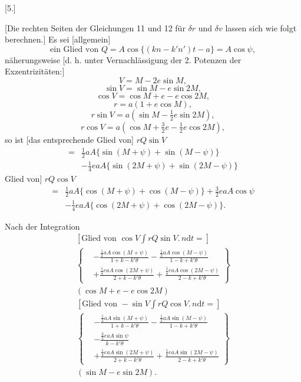 \par\bigskip
\hypertarget{native-392-ceres5}{}
\begin{center}[5.]\end{center}
\noindent\hspace*{\parindent}[Die rechten Seiten der Gleichungen 11 und 12 für \(\delta r\) und \(\delta v\) lassen sich wie folgt berechnen.] Es sei [allgemein]
\[
\text{ein Glied von }Q=A\cos\{(kn-k'n')t-a\}=A\cos\psi,
\]
 näherungsweise [d. h. unter Vernachlässigung der 2. Potenzen der Exzentrizitäten:]
\[V=M-2e\sin M,\]
\[\sin V=\sin M-e\sin2M,\]
\[\cos V=\cos M+e-e\cos2M,\]
\[r=a(1+e\cos M),\]
\[r\sin V=a(\sin M-\tfrac12e\sin2M),\]
\[r\cos V=a(\cos M+\tfrac32e-\tfrac12e\cos2M),\]
\noindent so ist [das entsprechende \hypertarget{native-393}{}Glied von] \(rQ\sin V\)
\[
\begin{aligned}
={}&\tfrac12aA\{\sin(M+\psi)+\sin(M-\psi)\}\\
&-\tfrac14eaA\{\sin(2M+\psi)+\sin(2M-\psi)\}
\end{aligned}
\]
\noindent Glied von] \(rQ\cos V\)
\[
\begin{aligned}
={}&\tfrac12aA\{\cos(M+\psi)+\cos(M-\psi)\}+\tfrac32eaA\cos\psi\\
&-\tfrac14eaA\{\cos(2M+\psi)+\cos(2M-\psi)\}.
\end{aligned}
\]

Nach der Integration
\[
\begin{gathered}
{}[\text{Glied von }\cos V\int rQ\sin V\mathord{.}\,n\mathrm{d}t=]\\[1ex]
\left\{\begin{aligned}
&-\frac{\tfrac12aA\cos(M+\psi)}{1+k-k'\theta}-\frac{\tfrac12aA\cos(M-\psi)}{1-k+k'\theta}\\
&+\frac{\tfrac14eaA\cos(2M+\psi)}{2+k-k'\theta}+\frac{\tfrac14eaA\cos(2M-\psi)}{2-k+k'\theta}
\end{aligned}\right\}\\[1ex]
(\cos M+e-e\cos2M)
\end{gathered}
\]
\[
\begin{gathered}
{}[\text{Glied von }-\sin V\int rQ\cos V\mathord{.}\,n\mathrm{d}t=]\\[1ex]
\left\{\begin{aligned}
&-\frac{\tfrac12aA\sin(M+\psi)}{1+k-k'\theta}-\frac{\tfrac12aA\sin(M-\psi)}{1-k+k'\theta}\\
&-\frac{\tfrac32eaA\sin\psi}{k-k'\theta}\\
&+\frac{\tfrac14eaA\sin(2M+\psi)}{2+k-k'\theta}+\frac{\tfrac14eaA\sin(2M-\psi)}{2-k+k'\theta}
\end{aligned}\right\}\\[1ex]
(\sin M-e\sin2M).
\end{gathered}
\]

